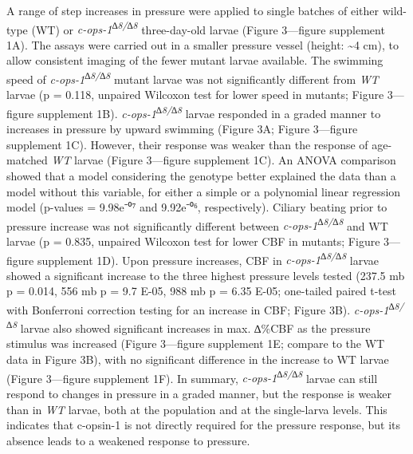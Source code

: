 \documentclass[
  11pt,
]{article}
\begin{document}
A range of step increases in pressure were applied to single batches of
either wild-type (WT) or \emph{c-ops-1\textsuperscript{∆8/∆8}}
three-day-old larvae (Figure 3---figure supplement 1A). The assays were
carried out in a smaller pressure vessel (height: \textasciitilde4 cm),
to allow consistent imaging of the fewer mutant larvae available. The
swimming speed of \emph{c-ops-1\textsuperscript{∆8/∆8}} mutant larvae
was not significantly different from \emph{WT} larvae (p = 0.118,
unpaired Wilcoxon test for lower speed in mutants; Figure 3---figure
supplement 1B). \emph{c-ops-1\textsuperscript{∆8/∆8}} larvae responded
in a graded manner to increases in pressure by upward swimming (Figure
3A; Figure 3---figure supplement 1C). However, their response was weaker
than the response of age-matched \emph{WT} larvae (Figure 3---figure
supplement 1C). An ANOVA comparison showed that a model considering the
genotype better explained the data than a model without this variable,
for either a simple or a polynomial linear regression model (p-values =
9.98e⁻⁰⁷ and 9.92e⁻⁰⁶, respectively). Ciliary beating prior to pressure
increase was not significantly different between
\emph{c-ops-1\textsuperscript{∆8/∆8}} and WT larvae (p = 0.835, unpaired
Wilcoxon test for lower CBF in mutants; Figure 3---figure supplement
1D). Upon pressure increases, CBF in
\emph{c-ops-1\textsuperscript{∆8/∆8}} larvae showed a significant
increase to the three highest pressure levels tested (237.5 mb p =
0.014, 556 mb p = 9.7 E-05, 988 mb p = 6.35 E-05; one-tailed paired
t-test with Bonferroni correction testing for an increase in CBF; Figure
3B). \emph{c-ops-1\textsuperscript{∆8/∆8}} larvae also showed
significant increases in max. ∆\%CBF as the pressure stimulus was
increased (Figure 3---figure supplement 1E; compare to the WT data in
Figure 3B), with no significant difference in the increase to WT larvae
(Figure 3---figure supplement 1F). In summary,
\emph{c-ops-1\textsuperscript{∆8/∆8}} larvae can still respond to
changes in pressure in a graded manner, but the response is weaker than
in \emph{WT} larvae, both at the population and at the single-larva
levels. This indicates that c-opsin-1 is not directly required for the
pressure response, but its absence leads to a weakened response to
pressure.
\end{document}
